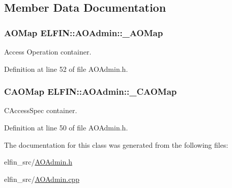 \subsection{Member Data Documentation}
\hypertarget{class_e_l_f_i_n_1_1_a_o_admin_aee21fd9858d0f8e3c897e47faaa53483}{
\subsubsection[{\-\_\-\-A\-O\-Map}]{\setlength{\rightskip}{0pt plus 5cm}A\-O\-Map E\-L\-F\-I\-N\-::\-A\-O\-Admin\-::\-\_\-\-A\-O\-Map\hspace{0.3cm}{\ttfamily [private]}}}\label{class_e_l_f_i_n_1_1_a_o_admin_aee21fd9858d0f8e3c897e47faaa53483}


Access Operation container. 



Definition at line 52 of file A\-O\-Admin.\-h.

\hypertarget{class_e_l_f_i_n_1_1_a_o_admin_acd6bbfe5fce9e349e5b563b73750e191}{
\subsubsection[{\-\_\-\-C\-A\-O\-Map}]{\setlength{\rightskip}{0pt plus 5cm}C\-A\-O\-Map E\-L\-F\-I\-N\-::\-A\-O\-Admin\-::\-\_\-\-C\-A\-O\-Map\hspace{0.3cm}{\ttfamily [private]}}}\label{class_e_l_f_i_n_1_1_a_o_admin_acd6bbfe5fce9e349e5b563b73750e191}


C\-Access\-Spec container. 



Definition at line 50 of file A\-O\-Admin.\-h.



The documentation for this class was generated from the following files\-:\begin{DoxyCompactItemize}
\item 
elfin\-\_\-src/\hyperlink{_a_o_admin_8h}{A\-O\-Admin.\-h}\item 
elfin\-\_\-src/\hyperlink{_a_o_admin_8cpp}{A\-O\-Admin.\-cpp}\end{DoxyCompactItemize}
